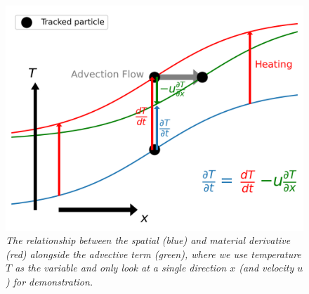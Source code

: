 \begin{figure}[ht!]
    \centering
    \includegraphics[scale=0.8]{graphics/advect.png}
    \caption{\textit{The relationship between the spatial (blue) and material derivative (red) alongside the advective term (green), where we use temperature $T$ as the variable and only look at a single direction $x$ (and velocity $u$) for demonstration.}}
    \label{fig:advection}
\end{figure}

